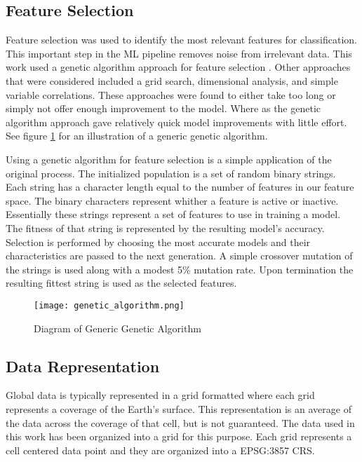 \subsection{Feature Selection}
Feature selection was used to identify the most relevant features for classification.
This important step in the \ac{ML} pipeline removes noise from irrelevant data.
This work used a genetic algorithm approach for feature selection \cite{yang1998feature}.
Other approaches that were considered included a grid search, dimensional analysis, and simple variable correlations.
These approaches were found to either take too long or simply not offer enough improvement to the model.
Where as the genetic algorithm approach gave relatively quick model improvements with little effort.
See figure \ref{fig:GA} for an illustration of a generic genetic algorithm.

\par
Using a genetic algorithm for feature selection is a simple application of the original process.
The initialized population is a set of random binary strings.
Each string has a character length equal to the number of features in our feature space.
The binary characters represent whither a feature is active or inactive.
Essentially these strings represent a set of features to use in training a model.
The fitness of that string is represented by the resulting model's accuracy.
Selection is performed by choosing the most accurate models and their characteristics are passed to the next generation.
A simple crossover mutation of the strings is used along with a modest 5\% mutation rate.
Upon termination the resulting fittest string is used as the selected features.


\begin{center}
    \begin{figure}[h]
        \caption{Diagram of Generic Genetic Algorithm}
        \label{fig:GA}
        \texttt{[image: genetic\_algorithm.png]}
    \end{figure}
\end{center}

\subsection{Data Representation}
Global data is typically represented in a grid formatted where each grid represents a coverage of the Earth's surface.
This representation is an average of the data across the coverage of that cell, but is not guaranteed.
The data used in this work has been organized into a grid for this purpose.
Each grid represents a cell centered data point and they are organized into a EPSG:3857 \ac{CRS}.

